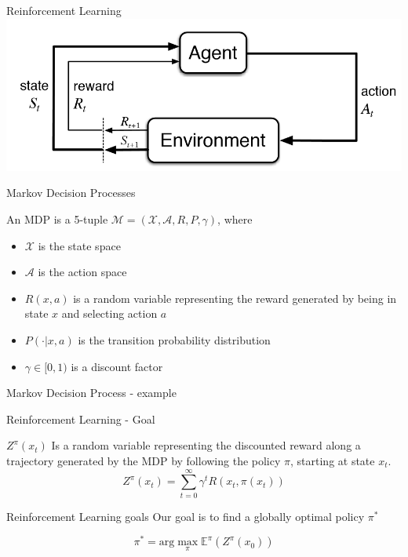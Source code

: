\documentclass{beamer}
\renewcommand{\exp}{\mathbb{E}}
\begin{document}
\begin{frame}{Reinforcement Learning}
\includegraphics[width=\linewidth]{../gfx/rl_cycle.png}
\end{frame}

\begin{frame}{Markov Decision Processes}

\begin{definition}
An MDP is a 5-tuple $\mathcal{M} = (\mathcal{X}, \mathcal{A}, R, P, \gamma)$, where

\begin{itemize}
\item $\mathcal{X}$ is the state space
\item $\mathcal{A}$ is the action space
\item $R(x, a)$ is a random variable representing the reward generated by being in state $x$ and selecting action $a$
\item $P(\cdot|x, a)$ is the transition probability distribution
\item $\gamma \in [0, 1)$ is a discount factor
\end{itemize}
\end{definition}

\end{frame}

\begin{frame}{Markov Decision Process - example}

\center
{}
\end{frame}

\begin{frame}{Reinforcement Learning - Goal}

\begin{definition}
$Z^\pi(x_t)$ Is a random variable representing the discounted reward along a trajectory generated by the MDP by following the policy $\pi$, starting at state $x_t$.
$$Z^\pi(x_{t})=\sum_{t=0}^\infty \gamma^tR(x_t,\pi(x_t))$$
\end{definition}

\begin{block}{Reinforcement Learning goals}
Our goal is to find a globally optimal policy $\pi^*$

$$\pi^* = \text{arg}\max_\pi \exp^\pi(Z^\pi(x_0))$$
\end{block}

\end{frame}
\end{document}
